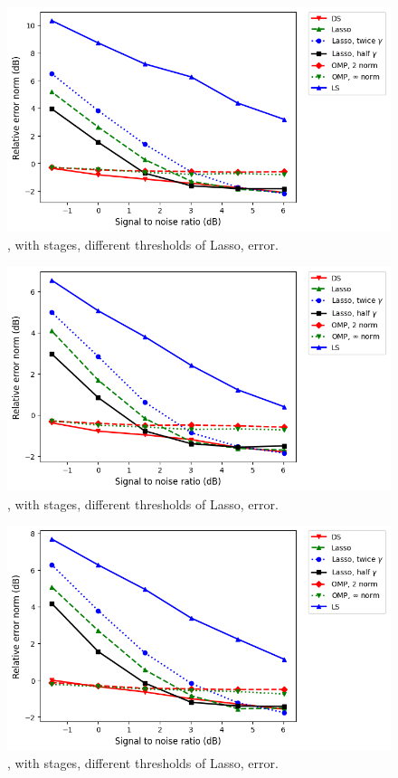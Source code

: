 %
\begin {figure} [H]
\includegraphics [width = \textwidth] {error-medium-more-square-six-lasso.png}
\caption {, with  stages, different thresholds of Lasso, error.}
\end {figure}
%
\begin {figure} [H]
\includegraphics [width = \textwidth] {error-medium-more-wide-six-lasso.png}
\caption {, with  stages, different thresholds of Lasso, error.}
\end {figure}
%
\begin {figure} [H]
\includegraphics [width = \textwidth] {error-medium-more-tall-six-lasso.png}
\caption {, with  stages, different thresholds of Lasso, error.}
\end {figure}
